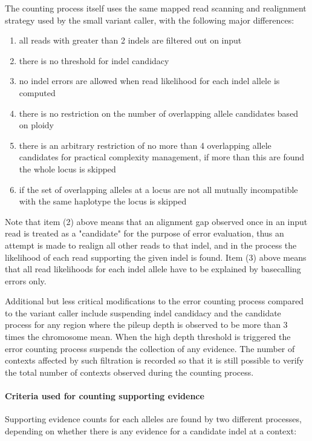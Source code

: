\documentclass{article}
\begin{document}
The counting process itself uses the same mapped read scanning and realignment strategy used by the small variant caller, with the following major differences:
 \begin{enumerate}
 \item all reads with greater than 2 indels are filtered out on input
 \item there is no threshold for indel candidacy
 \item no indel errors are allowed when read likelihood for each indel allele is computed
 \item there is no restriction on the number of overlapping allele candidates based on ploidy
 \item there is an arbitrary restriction of no more than 4 overlapping allele candidates for practical complexity management, if more than this are found the whole locus is skipped
 \item if the set of overlapping alleles at a locus are not all mutually incompatible with the same haplotype the locus is skipped
 \end{enumerate}
Note that item (2) above means that an alignment gap observed once in an input read is treated as a "candidate" for the purpose of error evaluation, thus an attempt is made to realign all other reads to that indel, and in the process the likelihood of each read supporting the given indel is found. Item (3) above means that all read likelihoods for each indel allele have to be explained by basecalling errors only.

Additional but less critical modifications to the error counting process compared to the variant caller include suspending indel candidacy and the candidate process for any region where the pileup depth is observed to be more than 3 times the chromosome mean. When the high depth threshold is triggered the error counting process suspends the collection of any evidence. The number of contexts affected by such filtration is recorded so that it is still possible to verify the total number of contexts observed during the counting process.

\paragraph{Criteria used for counting supporting evidence}

Supporting evidence counts for each alleles are found by two different processes, depending on whether there is any evidence for a candidate indel at a context:
\end{document}
